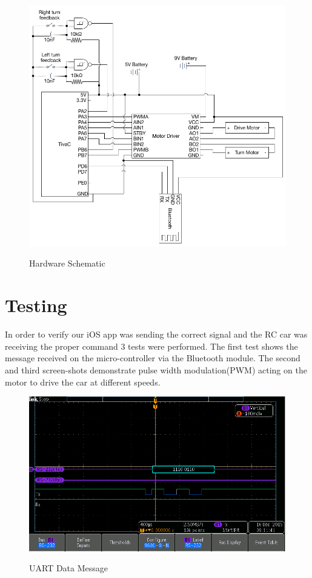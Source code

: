 \documentclass[12pt]{article}
\begin{document}
\begin{figure}[H]
\begin {center}
\includegraphics[scale=0.5]{Schematic}\\
\caption{Hardware Schematic}
\label{fig:hardware}
\end {center}
\end{figure}


\section{Testing}
In order to verify our iOS app was sending the correct signal and the RC car was receiving the proper command 3 tests were performed. The first test shows the message received on the micro-controller via the Bluetooth module. The second and third screen-shots demonstrate pulse width modulation(PWM) acting on the motor to drive the car at different speeds.\\

\begin{figure}[H]
\begin {center}
\includegraphics[scale=.75]{uart-message}\\
\caption{UART Data Message}
\end {center}
\end{figure}
\end{document}
